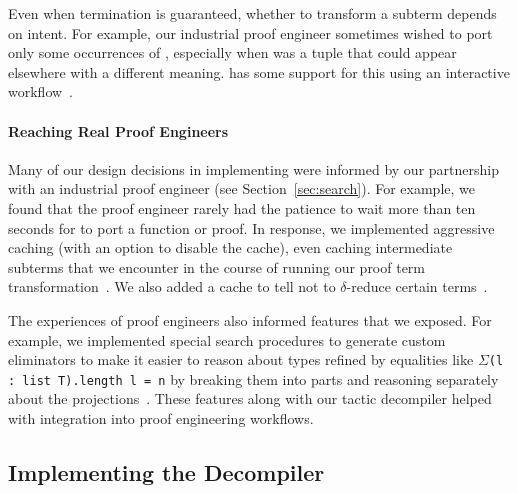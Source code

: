 Even when termination is guaranteed, whether to transform a subterm depends on intent.
For example, our industrial proof engineer sometimes wished to port only some occurrences of \A,
especially when \A was a tuple that could appear elsewhere
with a different meaning.
\toolname has some support for this using an interactive workflow~. %

\paragraph{Reaching Real Proof Engineers}
Many of our design decisions in implementing \toolname were informed by our partnership with
an industrial proof engineer (see Section~\ref{sec:search}).
For example, we found that the proof engineer rarely had the patience to wait more than ten seconds
for \toolname to port a function or proof.
In response, we implemented aggressive caching (with an option to disable the cache), even caching intermediate subterms that
we encounter in the course of running our proof term transformation~.
We also added a cache to tell \toolname not to $\delta$-reduce certain terms~. %

The experiences of proof engineers also informed features that we exposed.
For example, we implemented special search procedures to generate custom eliminators %
to make it easier to reason about types refined by equalities like $\Sigma$\lstinline{(l : list T).length l = n}
by breaking them into parts and reasoning separately about the projections~. %
These features along with our tactic decompiler helped with integration into proof engineering workflows.

\subsection{Implementing the Decompiler}
\label{sec:second}

